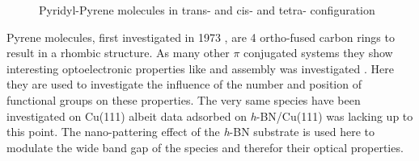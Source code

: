 \begin{figure}[]
	\begin{center}
	\end{center}
	\caption{Pyridyl-Pyrene molecules in trans-  and cis-  and tetra-  configuration}
	\label{fig:pyrene}
\end{figure}

Pyrene molecules, first investigated in 1973 \cite{khan_electronic_1973}, are 4 ortho-fused carbon rings to result in a rhombic structure. As many other $\pi$ conjugated systems they show interesting optoelectronic properties like \cite{crawford_experimental_2011, lee_enhanced_2012, feng_functionalization_2016, kurata_diarylamino-_2017, maeda_alkynylpyrenes_2006, kurata_diarylamino-_2017} and assembly was investigated \cite{pham_self-assembly_2014, matena_aggregation_2010, della_pia_anomalous_2014, pham_comparing_2016}. Here they are used to investigate the influence of the number and position of functional groups on these properties. The very same species have been investigated on Cu(111) albeit data adsorbed on \textit{h}-BN/Cu(111) was lacking up to this point. The nano-pattering effect of the \textit{h}-BN substrate is used here to modulate the wide band gap of the species and therefor their optical properties.
